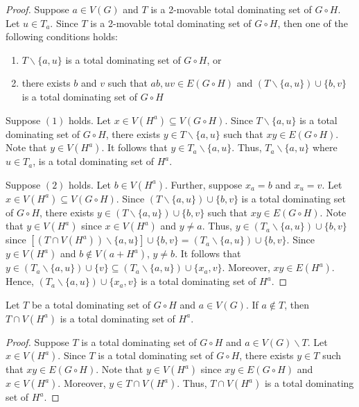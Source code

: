 \documentclass[twoside,12pt]{article}
\begin{document}
\begin{proof}
	Suppose $a \in V(G)$ and $T$ is a 2-movable total dominating set of $G \circ H$. Let $u \in T_a$. Since $T$ is a 2-movable total dominating set of $G \circ H$, then one of the following conditions holds:
	\begin{enumerate}
		\item[(1)] $T \backslash \{a,u\}$ is a total dominating set of $G \circ H$, or
		\item[(2)] there exists $b$ and $v$ such that $ab, uv \in E(G \circ H)$ and $(T \backslash \{a,u\}) \cup \{b, v\}$ is a total dominating set of $G \circ H$
	\end{enumerate}
	
	Suppose $(1)$ holds. Let $x \in V(H^a) \subseteq V(G \circ H)$. Since $T \backslash \{a,u\}$ is a total dominating set of $G \circ H$, there exists $y \in T \backslash \{a,u\}$ such that $xy \in E(G \circ H)$. Note that $y \in V(H^a)$. It follows that $y \in T_a \backslash \{a,u\}$. Thus, $T_a \backslash \{a,u\}$ where $u \in T_a$, is a total dominating set of $H^a$.
	
	Suppose $(2)$ holds. Let $b \in V(H^a)$. Further, suppose $x_a=b$ and $x_u=v$. Let $x \in V(H^a) \subseteq V(G \circ H)$. Since $(T \backslash \{a,u\}) \cup \{b,v\}$ is a total dominating set of $G \circ H$, there exists $y \in (T \backslash \{a,u\}) \cup \{b,v\}$ such that $xy \in E(G \circ H)$. Note that $y \in V(H^a)$ since $x \in V(H^a)$ and $y \not= a$. Thus, $y \in (T_a \backslash \{a,u\}) \cup \{b,v\}$ since $[(T \cap V(H^a)) \backslash \{a,u\}] \cup \{b,v\} = (T_a \backslash \{a,u\}) \cup \{b,v\}$. Since $y \in V(H^a)$ and $b \notin V(a + H^a)$, $y \not= b$. It follows that $y \in (T_a \backslash \{a,u\}) \cup \{v\} \subseteq (T_a \backslash \{a,u\}) \cup \{x_a, v\}$. Moreover, $xy \in E(H^a)$. Hence, $(T_a \backslash \{a,u\}) \cup \{x_a,v\}$ is a total dominating set of $H^a$.
\end{proof}	

\begin{lemma}\rm\label{Lem:3}
	Let $T$ be a total dominating set of $G \circ H$ and $a \in V(G)$. If $a \notin T$, then $T \cap V(H^a)$ is a total dominating set of $H^a$.
\end{lemma}

\begin{proof}
	Suppose $T$ is a total dominating set of $G \circ H$ and $a \in V(G) \backslash T$. Let $x \in V(H^a)$. Since $T$ is a total dominating set of $G \circ H$, there exists $y \in T$ such that $xy \in E(G \circ H)$. Note that $y \in V(H^a)$ since $xy \in E(G \circ H)$ and $x \in V(H^a)$. Moreover, $y \in T \cap V(H^a)$. Thus, $T \cap V(H^a)$ is a total dominating set of $H^a$.
\end{proof}	
\end{document}
